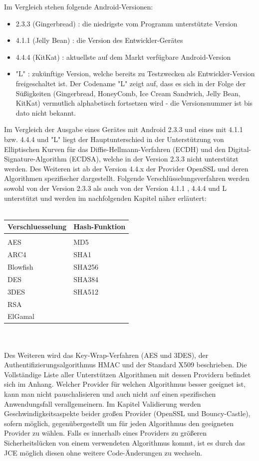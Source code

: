 \documentclass[10pt, a4paper]{scrreprt}
\begin{document}
Im Vergleich stehen folgende Android-Versionen:
\begin{itemize}
\item 2.3.3 (Gingerbread) : die niedrigste vom Programm unterstützte Version
\item 4.1.1 (Jelly Bean) : die Version des Entwickler-Gerätes
\item 4.4.4 (KitKat) : aktuellste auf dem Markt verfügbare Android-Version
\item "L" : zukünftige Version, welche bereits zu Testzwecken als Entwickler-Version freigeschaltet ist. Der Codename "L" zeigt auf, dass es sich in der Folge der Süßigkeiten (Gingerbread, HoneyComb, Ice Cream Sandwich, Jelly Bean, KitKat) vermutlich alphabetisch fortsetzen wird - die Versionsnummer ist bis dato nicht bekannt.
\end{itemize}
Im Vergleich der Ausgabe eines Gerätes mit Android 2.3.3 und eines mit 4.1.1 bzw. 4.4.4 und "L" liegt der Hauptunterschied in der Unterstützung von Elliptischen Kurven für das Diffie-Hellmann-Verfahren (ECDH) und den Digital-Signature-Algorithm (ECDSA), welche in der Version 2.3.3 nicht unterstützt werden. Des Weiteren ist ab der Version 4.4.x der Provider OpenSSL und deren Algorithmen spezifischer dargestellt.
Folgende Verschlüsselungsverfahren werden sowohl von der Version 2.3.3 als auch von der Version 4.1.1 , 4.4.4 und L unterstützt und werden im nachfolgenden Kapitel näher erläutert: \\ \\
\begin{tabular}{|l|l|} \hline\hline
\textbf{Verschluesselung} & \textbf{Hash-Funktion} \\ \hline &  \\
AES & MD5 \\
ARC4 & SHA1 \\
Blowfish & SHA256 \\
DES & SHA384 \\
3DES & SHA512 \\
RSA & \\
ElGamal & \\
\hline\hline
\end{tabular} \\
\\Des Weiteren wird das Key-Wrap-Verfahren (AES und 3DES), der Authentifizierungsalgorithmus HMAC und der Standard X509 beschrieben. Die Vollständige Liste aller Unterstützen Algorithmen mit dessen Providern befindet sich im Anhang. Welcher Provider für welchen Algorithmus besser geeignet ist, kann man nicht pauschalisieren und auch nicht auf einen spezifischen Anwendungsfall verallgemeinern. Im Kapitel Validierung werden Geschwindigkeitsaspekte beider großen Provider (OpenSSL und Bouncy-Castle), sofern möglich, gegenübergestellt um für jeden Algorithmus den geeigneten Provider zu wählen. Falls es innerhalb eines Providers zu größeren Sicherheitslücken von einem verwendeten Algorithmus kommt, ist es durch das JCE möglich diesen ohne weitere Code-Änderungen zu wechseln. 
\end{document}
